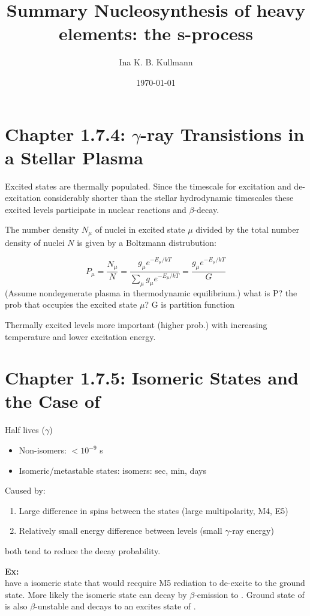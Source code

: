 \documentclass[a4paper,12pt]{article}
\title{\Huge{\textbf{Summary}} \newline \Large{Nucleosynthesis of heavy elements: the s-process}}
\author{Ina K. B. Kullmann}
\date{\today}
\begin{document}
\maketitle

\section*{Chapter 1.7.4: $\gamma$-ray Transistions in a Stellar Plasma}
Excited states are thermally populated. Since the timescale for excitation and de-excitation considerably shorter than the stellar hydrodynamic timescales these excited levels participate in nuclear reactions and $\beta$-decay. 

The number density $N_{\mu}$ of nuclei in excited state $\mu$ divided by the total number density of nuclei $N$ is given by a Boltzmann distrubution:

\begin{equation}
P_\mu = \frac{N_\mu}{N} = \frac{g_\mu e^{-E_\mu/kT}}{\sum_\mu g_\mu e^{-E_\mu/kT}} = \frac{g_\mu e^{-E_\mu/kT}}{G}
\end{equation}
(Assume nondegenerate plasma in thermodynamic equilibrium.)
what is P? the prob that occupies the excited state $\mu$? G is partition function

Thermally excited levels more important (higher prob.) with increasing temperature and lower excitation energy. 

\section*{Chapter 1.7.5: Isomeric States and the Case of }
Half lives ($\gamma$) 
\begin{itemize}
\item Non-isomers: $< 10^{-9}$ s
\item Isomeric/metastable states: isomers: sec, min, days
\end{itemize}

Caused by:
\begin{enumerate}
\item Large difference in spins between the states (large multipolarity, M4, E5)
\item Relatively small energy difference between levels (small $\gamma$-ray energy)
\end{enumerate}
both tend to reduce the decay probability.

\textbf{Ex:} \\
 have a isomeric state that would recquire M5 rediation to de-excite to the ground state. More likely the isomeric state can decay by $\beta$-emission to . Ground state of  is also $\beta$-unstable and decays to an excites state of .
\end{document}
